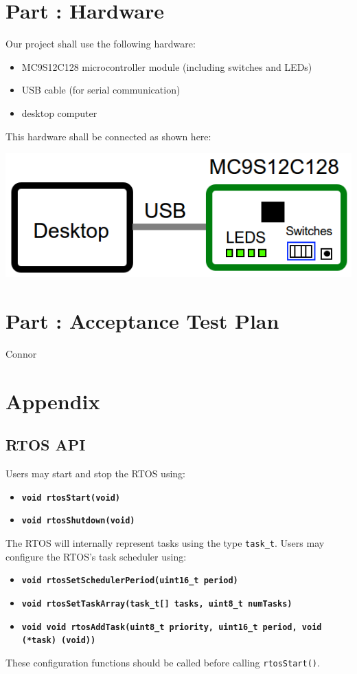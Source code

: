 \documentclass{article}
\newcounter{partNum}
\newcommand{\partNum}{%
        \stepcounter{partNum}%
        \thepartNum}
\newcommand{\sectPart}[1]{\section*{Part \partNum: #1}}
\newcommand{\bitem}[1]{\item \textbf{#1}}
\begin{document}

\sectPart{Hardware}

Our project shall use the following hardware:
\begin{itemize}
    \item MC9S12C128 microcontroller module (including switches and LEDs)
    \item USB cable (for serial communication)
    \item desktop computer
\end{itemize}
This hardware shall be connected as shown here:\\

\begin{center}
    \includegraphics[scale=0.5]{hardware.png}
\end{center}


\sectPart{Acceptance Test Plan}

Connor


\section*{Appendix}

	\subsection*{RTOS API}
		
        Users may start and stop the RTOS using:
        \begin{itemize}
            \bitem{\texttt{void rtosStart(void)}}
            \bitem{\texttt{void rtosShutdown(void)}}
        \end{itemize}

        The RTOS will internally represent tasks using the type \texttt{task\_t}. Users may configure the RTOS's task scheduler using:
        \begin{itemize}
            \bitem{\texttt{void rtosSetSchedulerPeriod(uint16\_t period)}}
            \bitem{\texttt{void rtosSetTaskArray(task\_t[] tasks, uint8\_t numTasks)}}
            \bitem{\texttt{void void rtosAddTask(uint8\_t priority, uint16\_t period, void (*task) (void))}}
        \end{itemize}
        These configuration functions should be called before calling \texttt{rtosStart()}. \\
\end{document}

